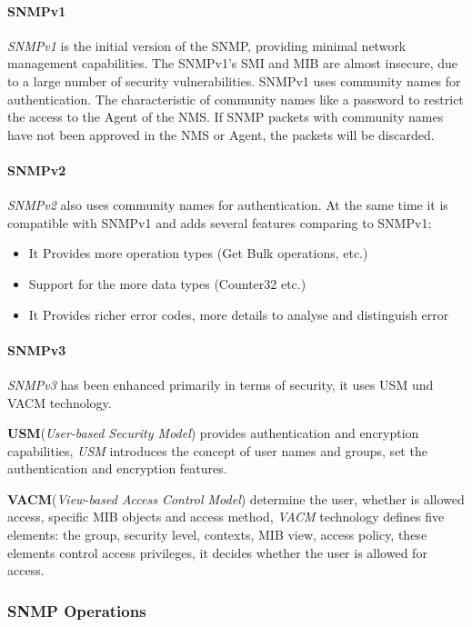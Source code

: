\paragraph{SNMPv1}

\textit{SNMPv1} is the initial version of the SNMP, providing minimal network management capabilities. The SNMPv1's SMI and MIB are almost insecure, due to a large number of security vulnerabilities.  
SNMPv1 uses community names for authentication. The characteristic of community names like a password to restrict the access to the Agent of the NMS. If SNMP packets with community names have not been approved in the NMS or Agent, the packets will be discarded.  

\paragraph{SNMPv2}

\textit{SNMPv2} also uses community names for authentication. At the same time it is compatible with SNMPv1 and adds several features comparing to SNMPv1:
\begin{itemize}
	\item It Provides more operation types (Get Bulk operations, etc.)
	\item Support for the more data types (Counter32 etc.)
	\item It Provides richer error codes, more details to analyse and distinguish error
\end{itemize}

\paragraph{SNMPv3}

\textit{SNMPv3} has been enhanced primarily in terms of security, it uses USM und VACM technology.  

\textbf{USM}(\textit{User-based Security Model}) provides authentication and encryption capabilities, \textit{USM} introduces the concept of user names and groups, set the authentication and encryption features.  

\textbf{VACM}(\textit{View-based Access Control Model}) determine the user, whether is allowed access, specific MIB objects and access method, \textit{VACM} technology defines five elements: the group, security level, contexts, MIB view, access policy, these elements control access privileges, it decides whether the user is allowed for access.

\subsubsection{SNMP Operations}

